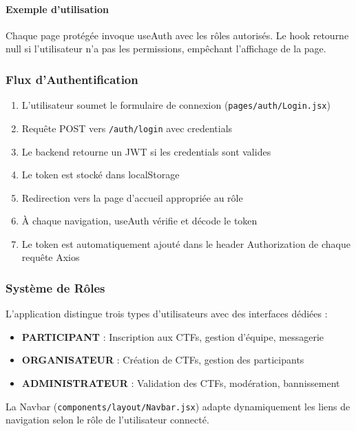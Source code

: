 \paragraph{Exemple d'utilisation}

Chaque page protégée invoque useAuth avec les rôles autorisés. Le hook retourne null si l'utilisateur n'a pas les permissions, empêchant l'affichage de la page.

\subsubsection{Flux d'Authentification}

\begin{enumerate}
    \item L'utilisateur soumet le formulaire de connexion (\texttt{pages/auth/Login.jsx})
    \item Requête POST vers \texttt{/auth/login} avec credentials
    \item Le backend retourne un JWT si les credentials sont valides
    \item Le token est stocké dans localStorage
    \item Redirection vers la page d'accueil appropriée au rôle
    \item À chaque navigation, useAuth vérifie et décode le token
    \item Le token est automatiquement ajouté dans le header Authorization de chaque requête Axios
\end{enumerate}

\subsubsection{Système de Rôles}

L'application distingue trois types d'utilisateurs avec des interfaces dédiées :

\begin{itemize}
    \item \textbf{PARTICIPANT} : Inscription aux CTFs, gestion d'équipe, messagerie
    \item \textbf{ORGANISATEUR} : Création de CTFs, gestion des participants
    \item \textbf{ADMINISTRATEUR} : Validation des CTFs, modération, bannissement
\end{itemize}

La Navbar (\texttt{components/layout/Navbar.jsx}) adapte dynamiquement les liens de navigation selon le rôle de l'utilisateur connecté.

